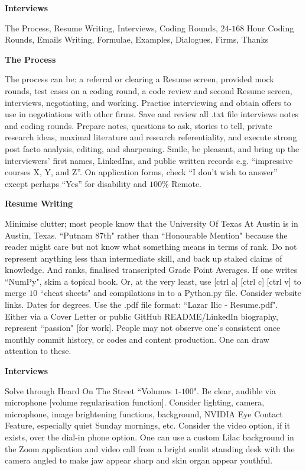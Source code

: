 \huge
\textbf{Interviews}
\Large

The Process, Resume Writing, Interviews, Coding Rounds, $24$-$168$ Hour Coding Rounds, Emails Writing, Formulae, Examples, Dialogues, Firms, Thanks

\textbf{The Process}

The process can be: a referral or clearing a Resume screen, provided mock rounds, test cases on a coding round, a code review and second Resume screen, interviews, negotiating, and working. Practise interviewing and obtain offers to use in negotiations with other firms. Save and review all .txt file interviews notes and coding rounds. Prepare notes, questions to ask, stories to tell, private research ideas, maximal literature and research referentiality, and execute strong post facto analysis, editing, and sharpening. Smile, be pleasant, and bring up the interviewers' first names, LinkedIns, and public written records e.g. ``impressive courses X, Y, and Z''. On application forms, check ``I don't wish to answer'' except perhaps ``Yes'' for disability and $100\%$ Remote.

\textbf{Resume Writing}

Minimise clutter; most people know that the University Of Texas At Austin is in Austin, Texas. ``Putnam $87$th" rather than ``Honourable Mention" because the reader might care but not know what something means in terms of rank. Do not represent anything less than intermediate skill, and back up staked claims of knowledge. And ranks, finalised transcripted Grade Point Averages. If one writes ``NumPy", skim a topical book. Or, at the very least, use [ctrl a] [ctrl c] [ctrl v] to merge $10$ ``cheat sheets" and compilations in to a Python.py file. Consider website links. Dates for degrees. Use the .pdf file format: ``Lazar Ilic - Resume.pdf". Either via a Cover Letter or public GitHub README/LinkedIn biography, represent ``passion" [for work]. People may not observe one's consistent once monthly commit history, or codes and content production. One can draw attention to these.

\textbf{Interviews}

Solve through Heard On The Street ``Volumes $1$-$100$". Be clear, audible via microphone [volume regularisation function]. Consider lighting, camera, microphone, image brightening functions, background, NVIDIA Eye Contact Feature, especially quiet Sunday mornings, etc. Consider the video option, if it exists, over the dial-in phone option. One can use a custom Lilac background in the Zoom application and video call from a bright sunlit standing desk with the camera angled to make jaw appear sharp and skin organ appear youthful.

